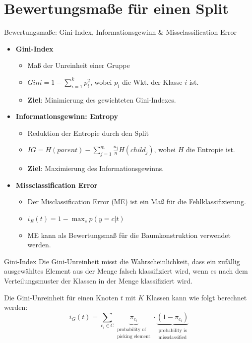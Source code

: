 \documentclass{beamer}
\begin{document}

\section{Bewertungsmaße für einen Split}

\begin{frame}{Bewertungsmaße: Gini-Index, Informationsgewinn \& Missclassification Error}
	\begin{itemize}
		\item{\textbf{Gini-Index}}
		\begin{itemize}
			\item Maß der Unreinheit einer Gruppe
			\item $Gini = 1 - \sum_{i=1}^k p_i^2$, wobei $p_i$ die Wkt. der Klasse $i$ ist.
			\item \textbf{Ziel}: Minimierung des gewichteten Gini-Indexes.
		\end{itemize}
		\item{\textbf{Informationsgewinn: Entropy}}
		\begin{itemize}
			\item Reduktion der Entropie durch den Split
			\item $IG = H(parent) - \sum_{j=1}^m \frac{n_j}{n} H(child_j)$, wobei $H$ die Entropie ist.
			\item \textbf{Ziel}: Maximierung des Informationsgewinns.
		\end{itemize}
		\item{\textbf{Missclassification Error}}
		\begin{itemize}
			\item {Der Misclassification Error (ME) ist ein Maß für die Fehlklassifizierung.}
			\item $i_E (t) = 1 - \max_c p(y = c | t)$
			\item {ME kann als Bewertungsmaß für die Baumkonstruktion verwendet werden.}
		\end{itemize}
	\end{itemize}
\end{frame}


\begin{frame}{Gini-Index}
Die Gini-Unreinheit misst die Wahrscheinlichkeit, dass ein zufällig ausgewähltes Element aus der Menge falsch klassifiziert wird, wenn es nach dem Verteilungsmuster der Klassen in der Menge klassifiziert wird.

Die Gini-Unreinheit für einen Knoten $t$ mit $K$ Klassen kann wie folgt berechnet werden:
\[
i_G (t) = \sum_{c_i \in C} \underbrace{\pi_{c_i}}_{\substack{\text{probability of} \\ \text{picking element}}} \cdot \underbrace{(1 - \pi_{c_i})}_{\substack{\text{probability is} \\ \text{missclassified}}}
\]

\end{frame}
\end{document}
